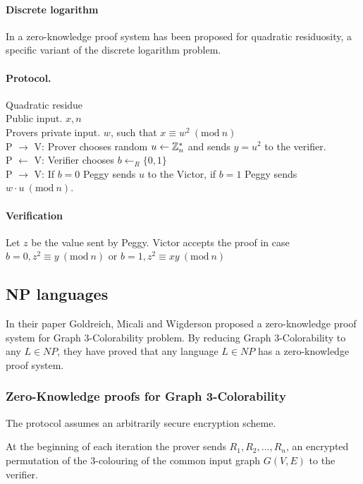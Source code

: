 \documentclass[12pt,a4paper]{article}
\newcommand{\Mod}[1]{\ (\mathrm{mod}\ #1)}
\begin{document}
\paragraph{Discrete logarithm}
In \cite{GMR} a zero-knowledge proof system has been proposed for quadratic residuosity, a specific variant of the discrete logarithm problem.\\

\paragraph{Protocol.} Quadratic residue\\
Public input. $x, n$\\
Provers private input. $w$, such that $x \equiv w^2 \Mod{n}$\\
P $\rightarrow$ V: Prover chooses random  $u \leftarrow \Bbb{Z}_{n}^{*}$ and sends $y = u^2$ to the verifier.\\
P $\leftarrow$ V: Verifier chooses $b \leftarrow_R \{0, 1\} $\\
P $\rightarrow$ V: If $b = 0$ Peggy sends $u$ to the Victor, if $b = 1$ Peggy sends $w \cdot u \Mod{n}$.\\

\paragraph{Verification}
Let $z$ be the value sent by Peggy. Victor accepts the proof in case $b = 0, z^2 \equiv y \Mod{n}$ or $b = 1, z^2 \equiv xy \Mod{n}$

\subsection{NP languages}
In their paper \cite{GMW} Goldreich, Micali and Wigderson proposed a zero-knowledge proof system for Graph 3-Colorability problem.
By reducing Graph 3-Colorability to any $L \in NP$, they have proved that any language $L \in NP$ has a zero-knowledge proof system.

\subsubsection{Zero-Knowledge proofs for Graph 3-Colorability}
The protocol assumes an arbitrarily secure encryption scheme.

At the beginning of each iteration the prover sends $R_1, R_2, ..., R_n$, an encrypted permutation of the 3-colouring of the common input graph $G(V,E)$ to the verifier.
\end{document}
